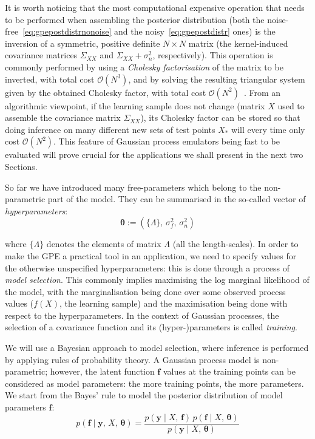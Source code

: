\noindent
It is worth noticing that the most computational expensive operation that needs to be performed when assembling the posterior distribution (both the noise-free~\eqref{eq:gpepostdistrnonoise} and the noisy~\eqref{eq:gpepostdistr} ones) is the inversion of a symmetric, positive definite $N\times N$ matrix (the kernel-induced covariance matrices $\Sigma_{XX}$ and $\Sigma_{XX}+\sigma_n^2$, respectively). This operation is commonly performed by using a \textit{Cholesky factorisation} of the matrix to be inverted, with total cost $\mathcal{O}(N^3)$, and by solving the resulting triangular system given by the obtained Cholesky factor, with total cost $\mathcal{O}(N^2)$~\cite{Rasmussen:2006}. From an algorithmic viewpoint, if the learning sample does not change (matrix $X$ used to assemble the covariance matrix $\Sigma_{XX}$), its Cholesky factor can be stored so that doing inference on many different new sets of test points $X_{*}$ will every time only cost $\mathcal{O}(N^2)$. This feature of Gaussian process emulators being fast to be evaluated will prove crucial for the applications we shall present in the next two Sections.

\vspace{0.2cm}
So far we have introduced many free-parameters which belong to the non-parametric part of the model. They can be summarised in the so-called vector of \textit{hyperparameters}:
\begin{equation}
    \boldsymbol{\theta}:=(\{\Lambda\},\,\sigma_f^2,\,\sigma_n^2)    
\end{equation}

\noindent
where $\{\Lambda\}$ denotes the elements of matrix $\Lambda$ (all the length-scales). In order to make the GPE a practical tool in an application, we need to specify values for the otherwise unspecified hyperparameters: this is done through a process of \textit{model selection}. This commonly implies maximising the log marginal likelihood of the model, with the marginalisation being done over some observed process values ($f(X)$, the learning sample) and the maximisation being done with respect to the hyperparameters. In the context of Gaussian processes, the selection of a covariance function and its (hyper-)parameters is called \textit{training}.

\vspace{0.2cm}
We will use a Bayesian approach to model selection, where inference is performed by applying rules of probability theory. A Gaussian process model is non-parametric; however, the latent function $\mathbf{f}$ values at the training points can be considered as model parameters: the more training points, the more parameters. We start from the Bayes' rule to model the posterior distribution of model parameters $\mathbf{f}$:
%
\begin{equation}
    p(\mathbf{f}\;\vert\; \mathbf{y},\,X,\,\boldsymbol{\theta}) = \frac{p(\mathbf{y}\;\vert\; X,\,\mathbf{f})\,p(\mathbf{f}\;\vert\; X,\,\boldsymbol{\theta})}{p(\mathbf{y}\;\vert\; X,\,\boldsymbol{\theta})}    
\end{equation}

